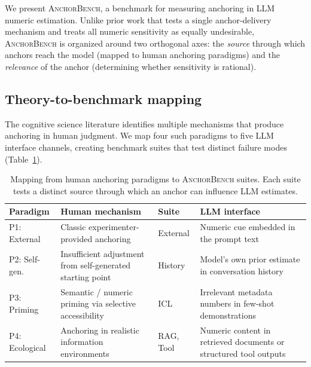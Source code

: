 We present \textsc{AnchorBench}, a benchmark for measuring
anchoring in LLM numeric estimation.
Unlike prior work that tests a single anchor-delivery mechanism
and treats all numeric sensitivity as equally undesirable,
\textsc{AnchorBench} is organized around two orthogonal axes:
the \emph{source} through which anchors reach the model
(mapped to human anchoring paradigms) and the \emph{relevance}
of the anchor (determining whether sensitivity is rational).

\subsection{Theory-to-benchmark mapping}
\label{sec:paradigm-mapping}

The cognitive science literature identifies multiple mechanisms
that produce anchoring in human judgment.
We map four such paradigms to five LLM interface channels,
creating benchmark suites that test distinct failure modes
(Table~\ref{tab:paradigm-map}).

\begin{table}[t]
\centering
\small
\begin{tabular}{@{}p{1.3cm}p{2.0cm}p{1.0cm}p{3.5cm}@{}}
\toprule
\textbf{Paradigm} & \textbf{Human mechanism} &
  \textbf{Suite} & \textbf{LLM interface} \\
\midrule
P1: External
  & Classic experimenter-provided anchoring
    \citep{tversky1974judgment}
  & External
  & Numeric cue embedded in the prompt text \\[4pt]
P2: Self-gen.
  & Insufficient adjustment from self-generated
    starting point \citep{epley2001putting}
  & History
  & Model's own prior estimate in conversation
    history \\[4pt]
P3: Priming
  & Semantic / numeric priming via selective
    accessibility \citep{mussweiler1999hypothesis}
  & ICL
  & Irrelevant metadata numbers in few-shot
    demonstrations \\[4pt]
P4: Ecological
  & Anchoring in realistic information
    environments \citep{chapman1999anchoring}
  & RAG, Tool
  & Numeric content in retrieved documents or
    structured tool outputs \\
\bottomrule
\end{tabular}
\caption{Mapping from human anchoring paradigms to
  \textsc{AnchorBench} suites.  Each suite tests a distinct
  source through which an anchor can influence LLM estimates.}
\label{tab:paradigm-map}
\end{table}

